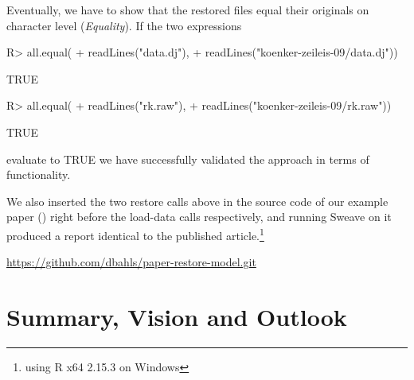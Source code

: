 \documentclass{sig-alternate}
\begin{document}
Eventually, we have to show that the restored files equal their originals on character level (\textit{Equality}).
If the two expressions
\begin{Schunk}
\begin{Sinput}
R> all.equal(
+    readLines("data.dj"), 
+    readLines("koenker-zeileis-09/data.dj")) 
\end{Sinput}
\begin{Soutput}
[1] TRUE
\end{Soutput}
\begin{Sinput}
R> all.equal(
+    readLines("rk.raw"), 
+    readLines("koenker-zeileis-09/rk.raw")) 
\end{Sinput}
\begin{Soutput}
[1] TRUE
\end{Soutput}
\end{Schunk}
evaluate to TRUE we have successfully validated the approach in terms of functionality.

We also inserted the two restore calls above in the source code of our example paper (\cite{KoenkerZeileis2009}) right before the load-data calls respectively, and running Sweave on it produced a report identical to the published article.\footnote{using R x64 2.15.3 on Windows}


%
%
\url{https://github.com/dbahls/paper-restore-model.git}


\section{Summary, Vision and Outlook}\label{sec:outlook}
\end{document}
